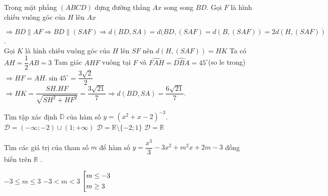 \begin{ex}
{\begin{center}
\begin{tikzpicture}[scale=0.5]
			\end{tikzpicture}
		\end{center} 
		Trong mặt phẳng $(ABCD)$ dựng đường thẳng $Ax$ song song $BD$. Gọi $F$ là hình chiếu vuông góc của $H$ lên $ Ax $ 
		
		$\Rightarrow BD \parallel AF \Rightarrow  BD\parallel(SAF)\Rightarrow d(BD,SA)= d(BD,(SAF) =d(B,(SAF)) =2d(H,(SAF))$. \\
		Gọi $K$ là hình chiếu vuông góc của $H$ lên $SF$ nên $ d(H,(SAF))=HK$
		Ta có $ AH=\dfrac{1}{2}AB =3 $ 
		Tam giác $AHF$ vuông tại $F$ và $\widehat{FAH}=\widehat{DBA}=45^\circ$(so le trong)$\Rightarrow HF =AH.\sin 45^\circ= \dfrac{3\sqrt{2}}{2}$
		$\Rightarrow HK=\dfrac{SH.HF}{\sqrt{SH^2+HF^2}}=\dfrac{3\sqrt{21}}{7} \Rightarrow d(BD,SA)=\dfrac{6\sqrt{21}}{7}$.
	}
\end{ex} 

\begin{ex}%
	Tìm tập xác định $\mathbb{D}$ của hàm số $y=\left( x^2+x-2\right)^{-3}$.
	{ $\mathscr{D}=(-\infty;-2)\cup(1;+\infty) $}
	{ \True $\mathscr{D}=\mathbb{R}\setminus\lbrace{-2;1\rbrace} $} 
	{ $ \mathscr{D}=\mathbb{R}$}
\end{ex} 

\begin{ex}%
	Tìm các giá trị của tham số $m$ để hàm số  $ y=\dfrac{x^3}{3} -3x^2+m^2x+2m-3 $ đồng biến trên $\mathbb{R}$   .
	
	{ $ -3\leq m \leq 3 $}
	{$ -3<m<3$} 
	{\True $  \hoac{&m\leq -3\\&m \geq 3} $}
\end{ex} 


